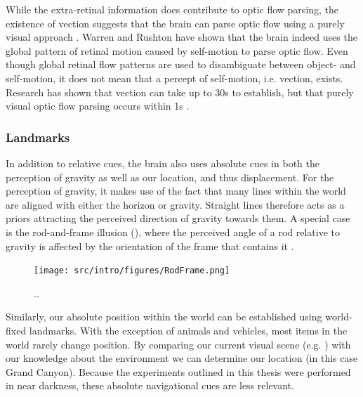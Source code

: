 While the extra-retinal information does contribute to optic flow parsing, the existence of vection \cite{dichgans1978} suggests that the brain can parse optic flow using a purely visual approach \cite{rushton2005,warren2007}. Warren and Rushton \citeyear{warren2009} have shown that the brain indeed uses the global pattern of retinal motion caused by self-motion to parse optic flow. Even though global retinal flow patterns are used to disambiguate between object- and self-motion, it does not mean that a percept of self-motion, i.e. vection, exists. Research has shown that vection can take up to 30s to establish, but that purely visual optic flow parsing occurs within 1s \cite{warren2009}.

\subsubsection{Landmarks}
In addition to relative cues, the brain also uses absolute cues in both the perception of gravity as well as our location, and thus displacement. For the perception of gravity, it makes use of the fact that many lines within the world are aligned with either the horizon or gravity. Straight lines therefore acts as a priors attracting the perceived direction of gravity towards them. A special case is the rod-and-frame illusion (), where the perceived angle of a rod relative to gravity is affected by the orientation of the frame that contains it \cite{witkin1948}. 

\begin{figure}
	\texttt{[image: src/intro/figures/RodFrame.png]}
	\caption{..}
	\label{intro:fig9}
\end{figure}

Similarly, our absolute position within the world can be established using world-fixed landmarks. With the exception of animals and vehicles, most items in the world rarely change position. By comparing our current visual scene (e.g. ) with our knowledge about the environment we can determine our location (in this case Grand Canyon). Because the experiments outlined in this thesis were performed in near darkness, these absolute navigational cues are less relevant. 


